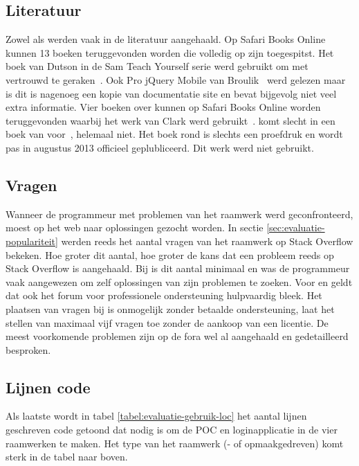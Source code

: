 \subsection{Literatuur}
Zowel \jqm{} als \st{} werden vaak in de literatuur aangehaald.
Op Safari Books Online kunnen 13 boeken teruggevonden worden die volledig op \jqm{} zijn toegespitst.
Het boek van Dutson in de Sam Teach Yourself serie werd gebruikt om met \jqm{} vertrouwd te geraken~\cite{PhilDutson2012}.
Ook Pro jQuery Mobile van Broulik~\cite{Broulik2012} werd gelezen maar is dit is nagenoeg een kopie van documentatie site en bevat bijgevolg niet veel extra informatie.
Vier boeken over \st{} kunnen op Safari Books Online worden teruggevonden waarbij het werk van Clark werd gebruikt~\cite{JohnEClark2012}.
\kendo{} komt slecht in een boek van voor~\cite{Bhandari2013},  \lungo{} helemaal niet.
Het boek rond \kendo{} is slechts een proefdruk en wordt pas in augustus 2013 officieel geplubliceerd.
Dit werk werd niet gebruikt.


\subsection{Vragen}
Wanneer de programmeur met problemen van het raamwerk werd geconfronteerd, moest op het web naar oplossingen gezocht worden.
In sectie \ref{sec:evaluatie-populariteit} werden reeds het aantal vragen van het raamwerk op Stack Overflow bekeken.
Hoe groter dit aantal,  hoe groter de kans dat een probleem reeds op Stack Overflow is aangehaald.
Bij \lungo{} is dit aantal minimaal en was de programmeur vaak aangewezen om zelf oplossingen van zijn problemen te zoeken.
Voor \st{} en \kendo{} geldt dat ook het forum voor professionele ondersteuning hulpvaardig bleek.
Het plaatsen van vragen bij \st{} is onmogelijk zonder betaalde ondersteuning,  \kendo{} laat het stellen van maximaal vijf vragen toe zonder de aankoop van een licentie.
De meest voorkomende problemen zijn op de fora wel al aangehaald en gedetailleerd besproken.


\subsection{Lijnen code}
Als laatste wordt in tabel \ref{tabel:evaluatie-gebruik-loc} het aantal lijnen geschreven code getoond dat nodig is om de POC en loginapplicatie in de vier raamwerken te maken.
Het type van het raamwerk (\js- of opmaakgedreven) komt sterk in de tabel naar boven.

